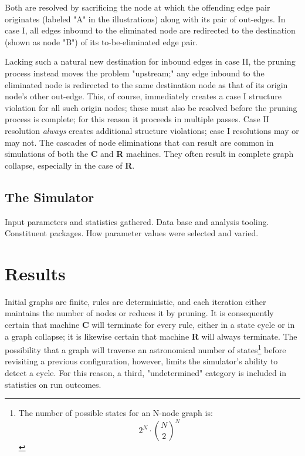 \documentclass[twoside,twocolumn]{article}
\begin{document}
Both are resolved by sacrificing the node at which the offending edge pair
originates (labeled "A" in the illustrations) along with its pair of out-edges.
In case I, all edges inbound to the eliminated node are redirected to 
the destination (shown as node "B") of its to-be-eliminated edge pair.

Lacking such a natural new destination for inbound edges in case II, the
pruning process instead moves the problem "upstream;" any edge inbound to
the eliminated node is redirected to the same destination node as that of
its origin node's other out-edge. This, of course, immediately creates a
case I structure violation for all such origin nodes; these must also be
resolved before the pruning process is complete; for this reason it proceeds
in multiple passes. Case II resolution
\textit{always} creates additional structure violations; case I resolutions
may or may not. The cascades of node eliminations that can result are common
in simulations of both the \textbf{C} and \textbf{R} machines. They often result in complete
graph collapse, especially in the case of \textbf{R}.

\subsection{The Simulator}

Input parameters and statistics gathered. Data base and analysis tooling.
Constituent packages. How parameter values were selected and varied.


\section{Results}

Initial graphs are finite, rules are deterministic, and each iteration
either maintains the number of nodes or reduces it by pruning.
It is consequently certain that machine \textbf{C} will terminate for every rule,
either in a state cycle or in a graph collapse; it is likewise certain that
machine \textbf{R} will always terminate.
The possibility that a graph will traverse an astronomical number
of states\footnote{The number of possible states for an N-node graph is:
\[
2^N\cdot\binom{N}{2}^N
\]
}
before revisiting a previous configuration, however, limits the simulator's ability to
detect a cycle. For this reason, a third, "undetermined" category is included in
statistics on run outcomes.
\end{document}
